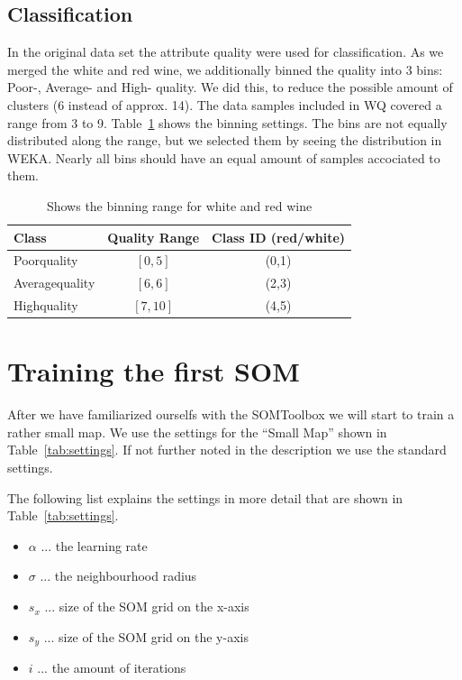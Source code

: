 \documentclass{acm_proc_article-sp}
\begin{document}
\subsection{Classification}

In the original data set the attribute quality were used for classification. As we merged the white and red wine,
we additionally binned the quality into 3 bins: Poor-, Average- and High- quality. We did this, to reduce the possible
amount of clusters (6 instead of approx. 14).
The data samples included in WQ covered a range from 3 to 9. Table~\ref{tab:quality-binning} shows the binning settings.
The bins are not equally distributed along the range, but we selected them by seeing the distribution in WEKA. Nearly
all bins should have an equal amount of samples accociated to them.

\begin{table}
\centering
\begin{tabular}{l|c|c}
    Class & Quality Range & Class ID (red/white)\\
    \hline
    \hline
    Poorquality & $[0,5]$ & (0,1) \\
    \hline
    Averagequality & $[6,6]$ & (2,3) \\
    \hline
    Highquality & $[7,10]$ & (4,5) \\
    \hline
\end{tabular}
\caption{Shows the binning range for white and red wine}
\label{tab:quality-binning}
\end{table}

\section{Training the first SOM}

After we have familiarized ourselfs with the SOMToolbox we will start to train a rather small
map. We use the settings for the ``Small Map'' shown in Table~\ref{tab:settings}. If not further
noted in the description we use the standard settings.

The following list explains the settings in more detail that are shown in Table~\ref{tab:settings}.

\begin{itemize}
    \item $\alpha$ ... the learning rate
    \item $\sigma$ ... the neighbourhood radius
    \item $s_x$ ... size of the SOM grid on the x-axis
    \item $s_y$ ... size of the SOM grid on the y-axis
    \item $i$ ... the amount of iterations
\end{itemize}
\end{document}
